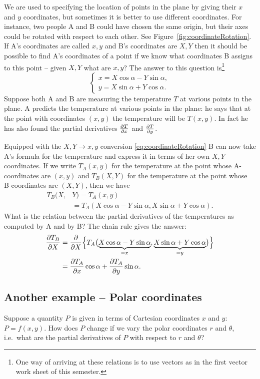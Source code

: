 We are used to specifying the location of points in the plane by giving their
$x$ and $y$ coordinates, but sometimes it is better to use different
coordinates.  For instance, two people A and B could have chosen the same
origin, but their axes could be rotated with respect to each other. See
Figure~\ref{fig:coordinateRotation}.  If A's coordinates are called $x,y$ and
B's coordinates are $X,Y$ then it should be possible to find A's coordinates of
a point if we know what coordinates B assigns to this point -- given $X,Y$ what
are $x,y$?  The answer to this question is\footnote{One way of arriving at these
  relations is to use vectors as in the first vector work sheet of this
  semester.}
\begin{equation}\label{eq:coordinateRotation}
  \left\{
    \begin{aligned}
      x = X\cos\alpha - Y\sin\alpha,\\
      y = X\sin\alpha + Y\cos\alpha.
    \end{aligned}
  \right.
\end{equation}
Suppose both A and B are measuring the temperature $T$ at various points in the
plane.  A predicts the temperature at various points in the plane: he says that
at the point with coordinates $(x,y)$ the temperature will be $T(x, y)$.  In
fact he has also found the partial derivatives $\frac{\partial T}{\partial x} $ and $\frac{\partial T}{\partial y} $.

Equipped with the $X,Y \to x,y$ conversion \eqref{eq:coordinateRotation} B can
now take A's formula for the temperature and express it in terms of her own
$X,Y$ coordinates.  If we write $T_A(x, y)$ for the temperature at the point
whose A-coordinates are $(x,y)$ and $T_B(X,Y)$ for the temperature at the point
whose B-coordinates are $(X,Y)$, then we have
\begin{align*}
  T_B(X,&Y) = T_A(x,y)\\
  &= T_A(X\cos\alpha - Y\sin\alpha, X\sin\alpha + Y\cos\alpha).
\end{align*}
What is the relation between the partial derivatives of the temperatures as
computed by A and by B?  The chain rule gives the answer:
\begin{align*}
  \frac{\partial T_B}{\partial X} &= \frac{\partial }{\partial X}\Bigl\{ T_A\bigl(\underbrace{X\cos\alpha -
    Y\sin\alpha}_{=x},
  \underbrace{X\sin\alpha + Y\cos\alpha}_{=y} \bigr)\Bigr\}\\
  &= \frac{\partial T_A}{\partial x} \cos\alpha + \frac{\partial T_A}{\partial y}\sin\alpha.
\end{align*}
\subsection{Another example -- Polar coordinates}
\label{sec:Chain-rule-polar-coordinates}
Suppose a quantity $P$ is given in terms of Cartesian coordinates $x$ and $y$:
$P=f(x, y)$.  How does $P$ change if we vary the polar coordinates $r$ and
$\theta$, i.e.\ what are the partial derivatives of $P$ with respect to $r$ and
$\theta$?

